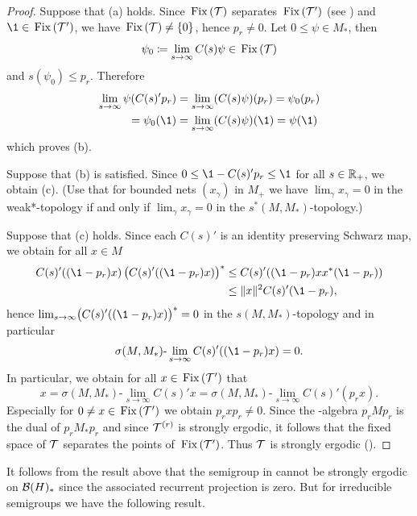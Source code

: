 \begin{proof}
Suppose that (a) holds.
Since $\mathop{}\mathrm{Fix}\left(\mathcal{T}\right)$ separates $\mathop{}\mathrm{Fix}\left(\mathcal{T}'\right)$ (see \textcite[Chap.~2, Theorem~1.4]{krengel:1985}) and $\1 \in \Fix{\TT'}$, we have $\mathop{}\mathrm{Fix}\left(\mathcal{T}\right) \neq \{0\}$, hence $p_{r} \neq 0$.
Let $0 \leq \psi \in M_{*}$, then 
%
\[
	\psi_{0} \coloneqq \lim_{s \to \infty} C(s)\psi \in \mathop{}\mathrm{Fix}\left(\mathcal{T}\right)
\]
%
and $s(\psi_{0}) \leq p_{r}$.
Therefore
\begin{align*}
\lim_{s \to \infty} \psi(C(s)'p_{r}) &= \lim_{s \to \infty} (C(s)\psi)(p_{r})  = \psi_{0}(p_{r})  \\
= \psi_{0}(\1) &= \lim_{s \to \infty} (C(s)\psi)(\1) = \psi(\1)
\end{align*}
which proves (b).

Suppose that (b) is satisfied.
Since $0 \leq \1 - C(s)'p_{r} \leq \1$ for all $s \in \mathbb{R}_{+}$, we obtain (c).
(Use that for bounded nets $(x_{\gamma})$ in $M_{+}$ we have $\lim_{\gamma}x_{\gamma} = 0$ in the weak*-topology if and only if\/ $\lim_{\gamma}x_{\gamma} = 0$ in the $s^{*}(M,M_{*})$-topology.)

Suppose that (c) holds.
Since each $C(s)'$ is an identity preserving Schwarz map, we obtain for all $x \in M$
\begin{align*}
	C(s)'((\1-p_{r})x)\,\bigl(C(s)'((\1-p_{r})x)\bigr)^{*} 
			&\leq C(s)'((\1-p_{r})xx^{*}(\1-p_{r}))  \\
 	&\leq \|x\|^2 C(s)'(\1-p_{r}),
\end{align*}
hence $\lim_{s \to \infty} \bigl(C(s)'((\1-p_{r})x)\bigr)^{*} = 0$ in the $s(M,M_{*})$-topology and in particular
\[
\sigma(M,M_{*})\text{-}\lim_{s \to \infty} C(s)'((\1-p_{r})x) = 0.
\]
In particular, we obtain for all $x \in \mathop{}\mathrm{Fix}\left(\mathcal{T}'\right)$ that 
\[
x = \sigma(M,M_{*})\text{-}\lim_{s \to \infty} C(s)'x = \sigma(M,M_{*})\text{-}\lim_{s \to \infty} C(s)'(p_{r}x) .
\]
Especially for $0 \neq x \in \mathop{}\mathrm{Fix}\left(\mathcal{T}'\right)$ we obtain $p_{r}xp_{r} \neq 0$.
Since the \WA-algebra $p_{r}Mp_{r}$ is the dual of\/ $p_{r}M_{*}p_{r}$ and since $\mathcal{T}^{(r)}$ is strongly ergodic, it follows that the fixed space of\/ $\mathcal{T}$ separates the points of\/ $\mathop{}\mathrm{Fix}\left(\mathcal{T}'\right)$.
Thus $\mathcal{T}$ is strongly ergodic (\textcite[Chap. 2, Theorem 1.4]{krengel:1985}).
\end{proof}
It follows from the result above that the semigroup in \textcite{evans:1977} cannot be strongly ergodic on $\mathcal{B}(H)_{*}$ since the associated recurrent projection is zero.
But for irreducible semigroups we have the following result.
